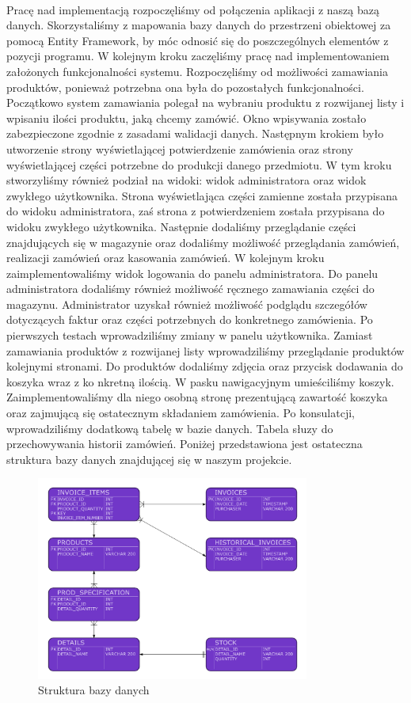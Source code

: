 \documentclass{article}
\begin{document}
\paragraph{}
Pracę nad implementacją rozpoczęliśmy od połączenia aplikacji z naszą bazą danych.
Skorzystaliśmy z mapowania bazy danych do przestrzeni obiektowej za pomocą Entity Framework, by móc odnosić
się do poszczególnych elementów z pozycji programu.
W kolejnym kroku zaczęliśmy pracę nad implementowaniem założonych funkcjonalności systemu.
Rozpoczęliśmy od możliwości zamawiania produktów, ponieważ potrzebna ona była do pozostałych
funkcjonalności. Początkowo system zamawiania polegał na wybraniu produktu z rozwijanej listy i
wpisaniu ilości produktu, jaką chcemy zamówić. Okno wpisywania zostało zabezpieczone zgodnie z
zasadami walidacji danych.
Następnym krokiem było utworzenie strony wyświetlającej potwierdzenie zamówienia oraz strony
wyświetlającej części potrzebne do produkcji danego przedmiotu. W tym kroku stworzyliśmy również
podział na widoki: widok administratora oraz widok zwykłego użytkownika. Strona wyświetlająca części
zamienne została przypisana do widoku administratora, zaś strona z potwierdzeniem została przypisana do
widoku zwykłego użytkownika. Następnie dodaliśmy przeglądanie części znajdujących się w magazynie
oraz dodaliśmy możliwość przeglądania zamówień, realizacji zamówień oraz kasowania zamówień.
W kolejnym kroku zaimplementowaliśmy widok logowania do panelu administratora. Do panelu administratora
dodaliśmy również możliwość ręcznego zamawiania części do magazynu. Administrator uzyskał również
możliwość podglądu szczegółów dotyczących faktur oraz części potrzebnych do konkretnego zamówienia.
Po pierwszych testach wprowadziliśmy zmiany w panelu użytkownika. Zamiast zamawiania produktów z
rozwijanej listy wprowadziliśmy przeglądanie produktów kolejnymi stronami. Do produktów dodaliśmy
zdjęcia oraz przycisk dodawania do koszyka wraz z ko nkretną ilością. W pasku nawigacyjnym
umieściliśmy koszyk. Zaimplementowaliśmy dla niego osobną stronę prezentującą zawartość koszyka oraz
zajmującą się ostatecznym składaniem zamówienia. Po konsulatcji, wprowadziliśmy dodatkową tabelę w
bazie danych. Tabela słuzy do przechowywania historii zamówień. 
Poniżej przedstawiona jest ostateczna struktura bazy danych znajdującej się w naszym projekcie.
\begin{figure}[H]
   \centering
   \includegraphics[width=0.8\textwidth,frame]{diagram_f.png}
   \caption{Struktura bazy danych}
\end{figure}
\end{document}
